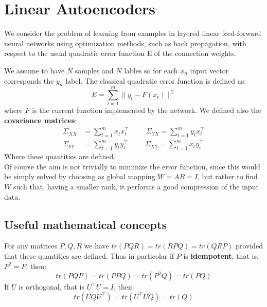 \section{Linear Autoencoders}
We consider the problem of learning from examples in layered linear feed-forward neural networks using optimization methods, such as back propagation, with respect to the usual quadratic error function E of the connection weights. 

We assume to have $N$ samples and $N$ lables so for each $x_n$ input vector corresponds the $y_n$ label. The classical quadratic error function is defined as:
\[
E = \sum_{t=1}^m \|y_t - F(x_t)\|^2 
\]
where $F$ is the current function implemented by the network. We defined also the \textbf{covariance matrices}:
\[
\begin{split}
    \Sigma_{XX} &= \sum_{t=1}^m x_t x_t^\intercal \hspace{1cm} \Sigma_{YX} = \sum_{t=1}^m y_t x_t^\intercal\\
    \Sigma_{YY} &= \sum_{t=1}^m y_t y_t^\intercal \hspace{1cm} \Sigma_{XY} = \sum_{t=1}^m x_t y_t^\intercal
\end{split}
\]
Where these quantities are defined. \\

Of course the aim is not trivially to minimize the error function, since this would be simply solved by choosing as global mapping $W = AB = I$, but rather to find $W$ such that, having a smaller rank, it performs a good compression of the input data.

\subsection{Useful mathematical concepts}
For any matrices $P, Q, R$ we have $tr(PQR) = tr(RPQ) = tr(QRP)$ provided that these quantities are defined. Thus in particolar if $P$ is \textbf{idempotent}, that is, $P^2 = P$, then:
\begin{equation}\tag{a}
    tr(PQP) = tr(PPQ) = tr(P^2Q) = tr(PQ)
\end{equation}
If $U$ is orthogonal, that is $U^\intercal U = I$, then:
\begin{equation}\tag{b}
    tr(UQU^\intercal) = tr(U^\intercal UQ) = tr(Q)
\end{equation}

